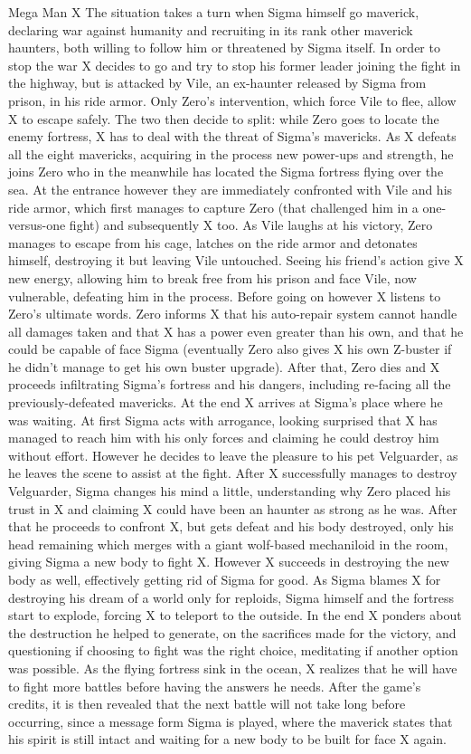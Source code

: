 \documentclass[openany]{report}
\begin{document}
\begin{chapter}{Mega Man X}
	The situation takes a turn when Sigma himself go maverick, declaring war against humanity and recruiting in its rank other maverick haunters, both willing to follow him or threatened by Sigma itself. In order to stop the war X decides to go and try to stop his former leader joining the fight in the highway, but is attacked by Vile, an ex-haunter released by Sigma from prison, in his ride armor. Only Zero's intervention, which force Vile to flee, allow X to escape safely. The two then decide to split: while Zero goes to locate the enemy fortress, X has to deal with the threat of Sigma's mavericks. As X defeats all the eight mavericks, acquiring in the process new power-ups and strength, he joins Zero who in the meanwhile has located the Sigma fortress flying over the sea. At the entrance however they are immediately confronted with Vile and his ride armor, which first manages to capture Zero (that challenged him in a one-versus-one fight) and subsequently X too. As Vile laughs at his victory, Zero manages to escape from his cage, latches on the ride armor and detonates himself, destroying it but leaving Vile untouched. Seeing his friend's action give X new energy, allowing him to break free from his prison and face Vile, now vulnerable, defeating him in the process. Before going on however X listens to Zero's ultimate words\cite{wiki:MMX_script}. Zero informs X that his auto-repair system cannot handle all damages taken and that X has a power even greater than his own, and that he could be capable of face Sigma (eventually Zero also gives X his own Z-buster if he didn't manage to get his own buster upgrade). After that, Zero dies and X proceeds infiltrating Sigma's fortress and his dangers, including re-facing all the previously-defeated mavericks. At the end X arrives at Sigma's place where he was waiting. At first Sigma acts with arrogance, looking surprised that X has managed to reach him with his only forces and claiming he could destroy him without effort. However he decides to leave the pleasure to his pet Velguarder, as he leaves the scene to assist at the fight. After X successfully manages to destroy Velguarder, Sigma changes his mind a little, understanding why Zero placed his trust in X and claiming X could have been an haunter as strong as he was. After that he proceeds to confront X, but gets defeat and his body destroyed, only his head remaining which merges with a giant wolf-based mechaniloid in the room, giving Sigma a new body to fight X. However X succeeds in destroying the new body as well, effectively getting rid of Sigma for good. As Sigma blames X for destroying his dream of a world only for reploids, Sigma himself and the fortress start to explode, forcing X to teleport to the outside. In the end X ponders about the destruction he helped to generate, on the sacrifices made for the victory, and questioning if choosing to fight was the right choice, meditating if another option was possible. As the flying fortress sink in the ocean, X realizes that he will have to fight more battles before having the answers he needs. 
	After the game's credits, it is then revealed that the next battle will not take long before occurring, since a message form Sigma is played, where the maverick states that his spirit is still intact and waiting for a new body to be built for face X again.

\end{chapter}
\end{document}
